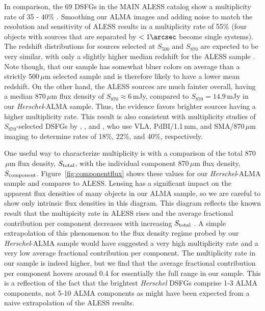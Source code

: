 \documentclass[iop]{emulateapj}
\begin{document}
In comparison, the 69 DSFGs in the MAIN ALESS catalog show a multiplicity rate
of 35 - 40\% \citep{Hodge:2013qy}.  Smoothing our ALMA images and adding
noise to match the resolution and sensitivity of ALESS results in a
multiplicity rate of 55\% (four objects with sources that are separated by
$<1\arcsec$ become single systems).  The redshift distributions for sources
selected at $S_{500}$ and $S_{870}$ are expected to be very similar, with only
a slightly higher median redshift for the ALESS sample \citep[e.g., $z_{\rm
med} = 2.0$ vs.  $z_{\rm med} = 2.2$; see][]{Zavala:2014lr}.  Note though, that
our sample has somewhat bluer colors on average than a strictly 500$\,\mu$m
selected sample and is therefore likely to have a lower mean redshift.
On the other hand, the ALESS sources are much fainter overall, having a median
870$\,\mu$m flux density of $S_{870} \approx 6\,$mJy, compared to $S_{870}
=14.9\,$mJy in our {\it Herschel}-ALMA sample.  Thus, the evidence favors brighter sources
having a higher multiplicity rate.  This result is also consistent with
multiplicity studies of $S_{870}$-selected DSFGs by \citet{Ivison:2007qv},
\citet{Smolcic:2012zl}, and \citet{Barger:2012yg}, who use VLA, PdBI/1.1$\,$mm,
and SMA/870$\,\mu$m imaging to determine rates of 18\%, 22\%, and 40\%,
respectively.

One useful way to characterize multiplicity is with a comparison of the total
870$\,\mu$m flux density, $S_{\rm total}$, with the individual component
870$\,\mu$m flux density, $S_{\rm component}$.  Figure~\ref{fig:componentflux}
shows these values for our {\it Herschel}-ALMA sample and compares to ALESS.  Lensing has a
significant impact on the apparent flux densities of many objects in our ALMA
sample, so we are careful to show only intrinsic flux densities in this
diagram.  This diagram reflects the known result that the multipicity rate in
ALESS rises and the average fractional contribution per component decreases
with increasing $S_{\rm total}$ \citep{Hodge:2013qy}.  A simple extrapolation
of this phenomenon to the flux density regime probed by our {\it Herschel}-ALMA sample would
have suggested a very high multiplicity rate and a very low average fractional
contribution per component.  The multiplicity rate in our sample is indeed
higher, but we find that the average fractional contribution per component
hovers around 0.4 for essentially the full range in our sample.  This is a
reflection of the fact that the brightest {\it Herschel} DSFGs comprise 1-3
ALMA components, not 5-10 ALMA components as might have been expected from a
naive extrapolation of the ALESS results.  
\end{document}
